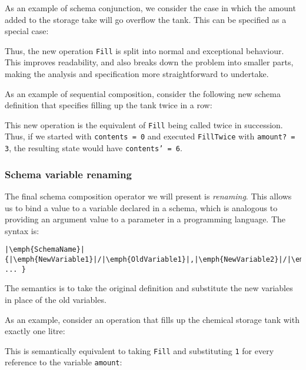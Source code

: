 \begin{example}
As an example of schema conjunction, we consider the case in which the amount added to the storage take will go overflow the tank. This can be specified as a special case:




Thus, the new operation \texttt{Fill} is split into normal and exceptional behaviour. This improves readability, and also breaks down the problem into smaller parts, making the analysis and specification more straightforward to undertake.

\end{example}

\begin{example}
As an example of sequential composition, consider the following new schema definition that specifies filling up the tank twice in a row:



This new operation is the equivalent of \texttt{Fill} being called twice in succession. Thus, if we started with \texttt{contents = 0} and executed \texttt{FillTwice} with \texttt{amount? = 3}, the resulting state would have \texttt{contents' = 6}.

\end{example}

\subsubsection*{Schema variable renaming}

The final schema composition operator we will present is \emph{renaming}. This allows us to bind a value to a variable declared in a schema, which is analogous to providing an argument value to a parameter in a programming language. The syntax is:

\lstset{aboveskip=3mm}
\begin{lstlisting}[escapeinside={||}]
  |\emph{SchemaName}| {|\emph{NewVariable1}|/|\emph{OldVariable1}|,|\emph{NewVariable2}|/|\emph{OldVariable2}| ... }
\end{lstlisting}

The semantics is to take the original definition and substitute the new variables in place of the old variables.

\begin{example}
As an example, consider an operation that fills up the chemical storage tank with exactly one litre:



This is semantically equivalent to taking \texttt{Fill} and substituting \texttt{1} for every reference to the variable \texttt{amount}:




\end{example}


